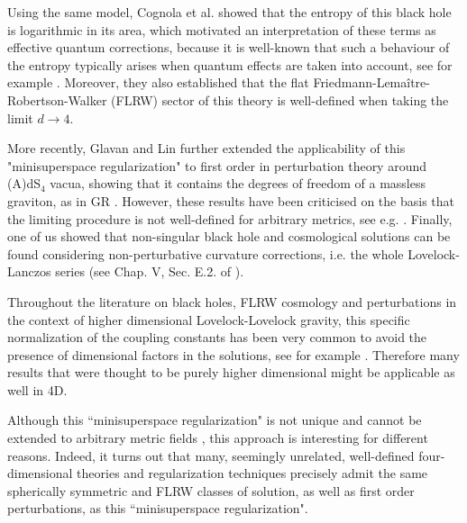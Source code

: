 \documentclass[aps,prd,preprint,nofootinbib]{revtex4-1}
\begin{document}
Using the same model, Cognola et al. \cite{Cognola:2013fva} showed that the entropy of this black hole is logarithmic in its area, which motivated an interpretation of these terms as effective quantum corrections, because it is well-known that such a behaviour of the entropy typically arises when quantum effects are taken into account, see for example \cite{Carlip,PerezNoui}. Moreover, they also established that the flat Friedmann-Lema\^{i}tre-Robertson-Walker (FLRW) sector of this theory is well-defined when taking the limit $d\to 4$. 

More recently,  Glavan and  Lin further extended the applicability of this "minisuperspace regularization" to first order in perturbation theory around (A)dS$_4$ vacua, showing that it contains the degrees of freedom of a massless graviton, as in GR \cite{Glavan:2019inb}. However, these results have been criticised on the basis that the limiting procedure is not well-defined for arbitrary metrics, see e.g. \cite{ConfGB2,Gurses:2020ofy,BianchiIGB2}.
Finally, one of us showed that non-singular black hole and cosmological solutions can be found considering non-perturbative curvature corrections, i.e. the whole Lovelock-Lanczos series  (see Chap. V, Sec. E.2. of \cite{aim}). 

Throughout the literature on black holes, FLRW cosmology and perturbations in the context of higher dimensional Lovelock-Lovelock gravity, this specific normalization of the coupling constants has been very common to avoid the presence of dimensional factors in the solutions, see for example \cite{Deruelle:1989fj, Maeda, Zanelli}. Therefore many results that were thought to be purely higher dimensional might be applicable as well in 4D.




Although this ``minisuperspace regularization" is not unique \cite{BianchiIGB2,ConfGB2} and cannot be extended to arbitrary metric fields \cite{TekinGB1,TekinGB2,Amplitudes}, this approach is interesting for different reasons. Indeed, it turns out that many, seemingly unrelated, well-defined four-dimensional theories and regularization techniques precisely admit the same spherically symmetric and FLRW classes of solution, as well as first order perturbations, as this ``minisuperspace regularization".
    
\end{document}
